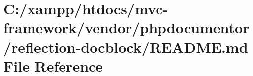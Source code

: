 \hypertarget{vendor_2phpdocumentor_2reflection-docblock_2_r_e_a_d_m_e_8md}{}\section{C\+:/xampp/htdocs/mvc-\/framework/vendor/phpdocumentor/reflection-\/docblock/\+R\+E\+A\+D\+ME.md File Reference}
\label{vendor_2phpdocumentor_2reflection-docblock_2_r_e_a_d_m_e_8md}
